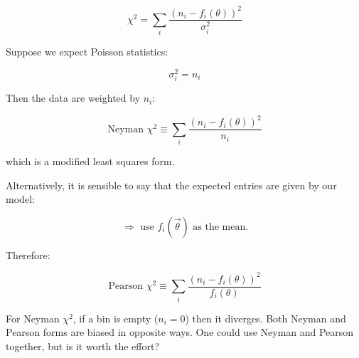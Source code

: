 \begin{itemize}
\begin{enumerate}
                    \[
                        \chi^2 = \sum_i \frac{(n_i - f_i(\theta))^2}{\sigma_i^2}
                    \]

                    Suppose we expect Poisson statistics:

                    \[
                        \sigma_i^2 = n_i
                    \]

                    Then the data are weighted by $n_i$:

                    \[
                        \text{Neyman } \chi^2 \equiv \sum_i \frac{(n_i - f_i(\theta))^2}{n_i}
                    \]

                    which is a modified least squares form.

                    Alternatively, it is sensible to say that the expected entries are given by our model:

                    \[
                        \Rightarrow \text{ use } f_i(\vec{\theta}) \text{ as the mean.}
                    \]

                    Therefore:

                    \[
                        \text{Pearson } \chi^2 \equiv \sum_i \frac{(n_i - f_i(\theta))^2}{f_i(\theta)}
                    \]

                    For Neyman $\chi^2$, if a bin is empty ($n_i = 0$) then it diverges.
                    Both Neyman and Pearson forms are biased in opposite ways.
                    One could use Neyman and Pearson together, but is it worth the effort?
          \end{enumerate}
\end{itemize}
